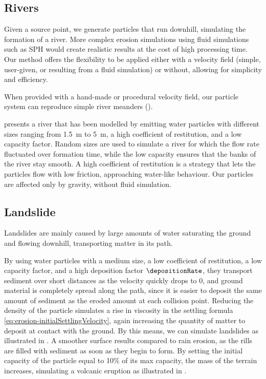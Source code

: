 \subsection{Rivers}

Given a source point, we generate particles that run downhill, simulating the formation of a river. More complex erosion simulations using fluid simulations such as SPH \cite{Kristof2009} would create realistic results at the cost of high processing time. Our method offers the flexibility to be applied either with a velocity field (simple, user-given, or resulting from a fluid simulation) or without, allowing for simplicity and efficiency.

When provided with a hand-made or procedural velocity field, our particle system can reproduce simple river meanders (). 

 presents a river that has been modelled by emitting water particles with different sizes ranging from \SI{1.5}{\meter} to \SI{5}{\meter}, a high coefficient of restitution, and a low capacity factor. Random sizes are used to simulate a river for which the flow rate fluctuated over formation time, while the low capacity ensures that the banks of the river stay smooth. A high coefficient of restitution is a strategy that lets the particles flow with low friction, approaching water-like behaviour. Our particles are affected only by gravity, without fluid simulation.

\subsection{Landslide}

Landslides are mainly caused by large amounts of water saturating the ground and flowing downhill, transporting matter in its path.

By using water particles with a medium size, a low coefficient of restitution, a low capacity factor, and a high deposition factor $\depositionRate$, they transport sediment over short distances as the velocity quickly drops to 0, and ground material is completely spread along the path, since it is easier to deposit the same amount of sediment as the eroded amount at each collision point. Reducing the density of the particle simulates a rise in viscosity in the settling formula \cref{eq:erosion-initialSettlingVelocity}, again increasing the quantity of matter to deposit at contact with the ground. By this means, we can simulate landslides as illustrated in . A smoother surface results compared to rain erosion, as the rills are filled with sediment as soon as they begin to form.  
By setting the initial capacity of the particle equal to 10\% of its max capacity, the mass of the terrain increases, simulating a volcanic eruption as illustrated in .

